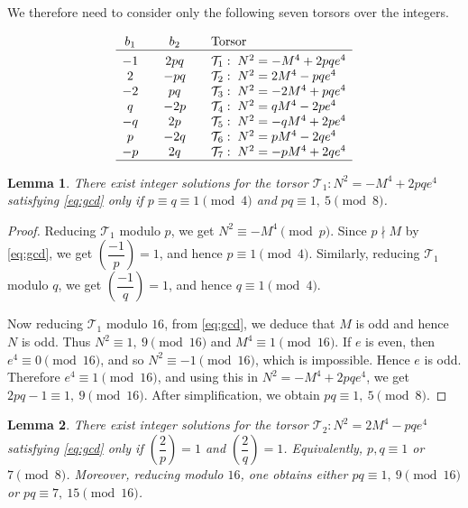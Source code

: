 \documentclass[12pt]{amsart}
\newcommand{\cT}{\mathcal{T}}
\numberwithin{equation}{section}
\newtheorem{lem}{Lemma}[section]
\theoremstyle{definition}
\begin{document}
We therefore need to consider only the following seven torsors over the integers.




\begin{table}[h]
\centering
\[
\begin{array}{c@{\qquad}c@{\qquad}l}
b_1 & b_2 & \text{Torsor} \\
\hline
\noalign{\vskip 3pt}
-1 & 2pq  & \cT_1:\; N^2=-M^4+2pqe^4 \\
 2 & -pq  & \cT_2:\; N^2=2M^4-pqe^4 \\
-2 & pq   & \cT_3:\; N^2=-2M^4+pqe^4 \\
 q & -2p  & \cT_4:\; N^2=qM^4-2pe^4 \\
-q & 2p   & \cT_5:\; N^2=-qM^4+2pe^4 \\
 p & -2q  & \cT_6:\; N^2=pM^4-2qe^4 \\
-p & 2q   & \cT_7:\; N^2=-pM^4+2qe^4 \\
\hline
\end{array}
\]
\caption{Torsors for $E_{-2pq}$.}
\label{table:T-torsors}
\end{table}


\begin{lem}
\label{lem:T1}
There exist integer solutions for the torsor $\cT_{1}: N^{2}=-M^{4}+2pqe^{4}$ satisfying \eqref{eq:gcd} only if $p\equiv q\equiv 1 \pmod 4$ and $pq\equiv 1,~5 \pmod 8$.
\end{lem}

\begin{proof}
Reducing $\cT_{1}$ modulo $p$, we get $N^{2}\equiv -M^{4}\pmod p$. Since $p\nmid M$ by \eqref{eq:gcd}, we get $\left(\dfrac{-1}{p}\right)=1$, and hence $p\equiv 1\pmod 4$. Similarly, reducing $\cT_{1}$ modulo $q$, we get $\left(\dfrac{-1}{q}\right)=1$, and hence $q\equiv 1\pmod 4$.

Now reducing $\cT_{1}$ modulo $16$, from \eqref{eq:gcd}, we deduce that $M$ is odd and hence $N$ is odd. Thus $N^{2}\equiv 1,~9\pmod {16}$ and $M^{4}\equiv 1\pmod {16}$. If $e$ is even, then $e^{4}\equiv 0\pmod {16}$, and so $N^{2}\equiv -1\pmod {16}$, which is impossible. Hence $e$ is odd. Therefore $e^{4}\equiv 1\pmod {16}$, and using this in $N^{2}=-M^{4}+2pqe^{4}$, we get $2pq-1\equiv 1,~9\pmod {16}$. After simplification, we obtain $pq\equiv 1,~5\pmod 8$.
\end{proof}



\smallskip
\begin{lem}
\label{lem:T2}
There exist integer solutions for the torsor $\cT_{2}: N^{2}=2M^{4}-pqe^{4}$ satisfying \eqref{eq:gcd} only if $\left(\dfrac{2}{p}\right)=1$ and $\left(\dfrac{2}{q}\right)=1$. Equivalently, $p,q\equiv 1$ or $7\pmod 8$. Moreover, reducing modulo $16$, one obtains either $pq\equiv 1,~9\pmod {16}$ or $pq\equiv 7,~15\pmod {16}$.
\end{lem}
\end{document}
